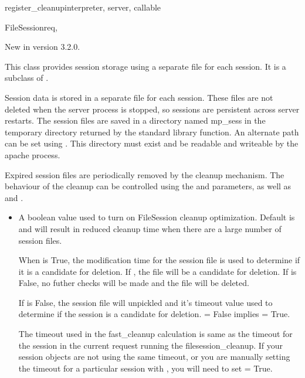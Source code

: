 \begin{funcdesc}{register_cleanup}{interpreter, server, callable}
\begin{classdesc}{FileSession}{req, }

  New in version 3.2.0.

  This class provides session storage using a separate file for each
  session. It is a subclass of .

  Session data is stored in a separate file for each session. These 
  files are not deleted when the server process is stopped, so
  sessions are persistent across server restarts.  
  The session files are saved in a directory named mp_sess in the 
  temporary directory returned by the  
  standard library function. An alternate path can be set using 
  . This
  directory must exist and be readable and writeable by the apache
  process.
  
  Expired session files are periodically removed by the cleanup
  mechanism. The behaviour of the cleanup can be controlled using the 
   and  parameters, as well as 
   and
  .

  \begin{itemize}
  \item
    A boolean value used to turn on FileSession cleanup optimization.
    Default is  and will result in reduced cleanup time when
    there are a large number of session files.
  
    When  is True, the modification time for the session
    file is used to determine if it is a candidate for deletion.
    If ,
    the file will be a candidate for deletion. If 
    is False, no futher checks will be made and the file will be
    deleted.
    
    If  is False, the session file will unpickled and
    it's timeout value used to determine if the session is a candidate for
    deletion.  = False implies  =
    True.

    The timeout used in the fast_cleanup calculation is same as the
    timeout for the session in the current request running the
    filesession_cleanup. If your session objects are not using the same
    timeout, or you are manually setting the timeout for a particular
    session with , you will need to set 
     = True.


\end{itemize}
\end{classdesc}
\end{funcdesc}

